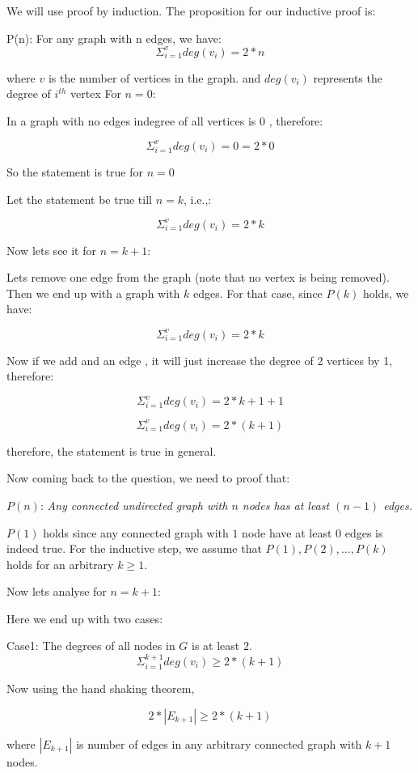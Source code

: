 \documentclass[answers]{exam}
\begin{document}
\begin{questions}
\begin{solution}
We will use proof by induction. The proposition for our inductive proof is:


P(n): For any graph with n edges, we have:
$$\Sigma_{i=1}^v deg(v_i) = 2*n$$

where $v$ is the number of vertices in the graph. and $deg(v_i)$ represents the degree of $i^{th}$ vertex
For $n=0$:

In a graph with no edges indegree of all vertices is $0$ , therefore:

$$\Sigma_{i=1}^v deg(v_i) = 0= 2*0$$

So the statement is true for $n=0$

\par Let the statement be true till $n=k$, i.e.,:

$$\Sigma_{i=1}^v deg(v_i) = 2*k$$

Now lets see it for $n=k+1$:

Lets remove one edge from the graph (note that no vertex is being removed). Then we end up with a graph with $k$ edges. For that case, since $P(k)$ holds, we have:

$$\Sigma_{i=1}^v deg(v_i) = 2*k$$

Now if we add and an edge , it will just increase the degree of 2 vertices by 1, therefore:

$$\Sigma_{i=1}^v deg(v_i) = 2*k+1+1$$

 $$\Sigma_{i=1}^v deg(v_i) = 2*(k+1)$$

therefore, the statement is true in general.

Now coming back to the question, we need to proof that:

$P(n)$: \textit{Any connected undirected graph with $n$ nodes has at least $(n-1)$ edges.}

$P(1)$ holds since any connected graph with $1$ node have at least $0$ edges is indeed true. 
For the inductive step, we assume that $P(1), P(2), ..., P(k)$ holds for an arbitrary $k \geq 1$.

Now lets analyse for $n=k+1$:

Here we end up with two cases:

Case1: The degrees of all nodes in $G$ is at least $2$. 
$$\Sigma_{i=1}^{k+1} deg(v_i) \geq2*(k+1)$$


Now using the hand shaking theorem, 

$$2*|E_{k+1}| \geq2*(k+1)$$

where $|E_{k+1}|$ is number of edges in any arbitrary connected graph with $k+1$ nodes.


\end{solution}
\end{questions}
\end{document}

